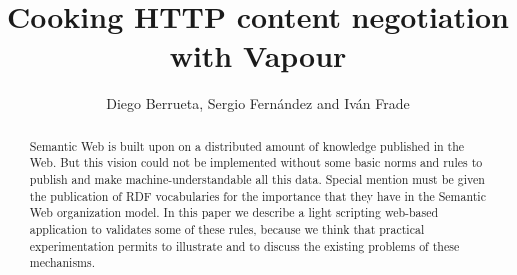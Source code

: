 \documentclass{../templates/llncs}
\begin{document}

\title{Cooking HTTP content negotiation with Vapour}



\author{Diego Berrueta, Sergio Fern\'andez and Iv\'an Frade}


\maketitle

\begin{abstract}
Semantic Web is built upon on a distributed amount of knowledge published in 
the Web. But this vision could not be implemented without some basic norms and 
rules to publish and make machine-understandable all this data. Special mention 
must be given the publication of RDF vocabularies for the importance that they 
have in the Semantic Web organization model. In this paper we describe a light 
scripting web-based application to validates some of these rules, because we 
think that practical experimentation permits to illustrate and to discuss the 
existing problems of these mechanisms.
\end{abstract}




\end{document}
